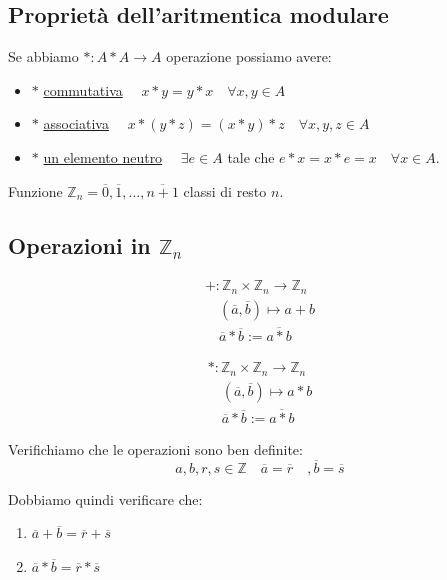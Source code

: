 \documentclass{article}
\theoremstyle{definition}
\begin{document}
\subsection{Proprietà dell'aritmentica modulare}
Se abbiamo $ * : A*A \to A $ operazione possiamo avere:
\begin{itemize}
        \item $ * $  \underline{commutativa} $ \quad x * y = y * x \quad \forall x,y \in A $
        \item $ * $  \underline{associativa} $ \quad x * (y * z) = (x * y) * z \quad \forall x,y,z \in A$
        \item $ * $ \underline{un elemento neutro} $ \quad \exists e \in A $ tale che $ e * x= x * e = x  \quad  \forall x \in A$. 
\end{itemize}
Funzione $ \mathbb{Z}_n = {\overline{0}, \overline{1},\ldots, \overline{n + 1}} $ classi di resto $ n $. 


\subsection{Operazioni in $\mathbb{Z}_n$}
\begin{align*}
        + : \mathbb{Z}_n \times \mathbb{Z}_n \to \mathbb{Z}_n \\
        \quad (\overline{a}, \overline{b}) \mapsto a + b \\
        \quad \overline{a} * \overline{b} := \overline{a * b}
\end{align*}

\begin{align*}
        * : \mathbb{Z}_n \times \mathbb{Z}_n \to \mathbb{Z}_n \\
        \quad (\overline{a}, \overline{b}) \mapsto a * b \\
        \quad \overline{a} * \overline{b} := \overline{a * b}
\end{align*}


Verifichiamo che le operazioni sono ben definite:
\begin{equation*}
        a,b,r,s \in \mathbb{Z} \quad \overline{a} = \overline{r} \quad ,\overline{b} = \overline{s}
\end{equation*}

Dobbiamo quindi verificare che:
\begin{enumerate}
        \item $\overline{a} + \overline{b} = \overline{r} + \overline{s}$  
        \item $\overline{a} * \overline{b} = \overline{r} * \overline{s}$  
\end{enumerate}
\end{document}
